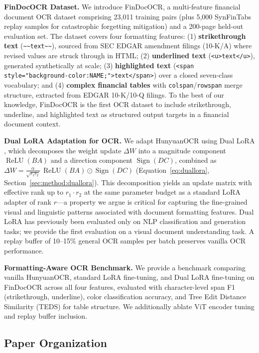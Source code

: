 \documentclass[10pt,twocolumn]{article}
\begin{document}
\textbf{FinDocOCR Dataset.} We introduce FinDocOCR, a multi-feature financial
document OCR dataset comprising 23{,}011 training pairs (plus 5{,}000 SynFinTabs
replay samples for catastrophic forgetting mitigation) and a 200-page held-out
evaluation set. The dataset covers four formatting features: (1)
\textbf{strikethrough text}
(\texttt{\textasciitilde\textasciitilde{}text\textasciitilde\textasciitilde}),
sourced from SEC EDGAR amendment filings (10-K/A) where revised values are
struck through in HTML; (2) \textbf{underlined text} (\texttt{<u>text</u>}),
generated synthetically at scale; (3) \textbf{highlighted text}
(\texttt{<span style="background-color:NAME;">text</span>}) over a closed seven-class
vocabulary; and (4) \textbf{complex financial tables} with
\texttt{colspan}/\texttt{rowspan} merge structure, extracted from EDGAR 10-K/10-Q
filings. To the best of our knowledge, FinDocOCR is the first OCR dataset to
include strikethrough, underline, and highlighted text as structured output targets
in a financial document context.

\textbf{Dual LoRA Adaptation for OCR.} We adapt HunyuanOCR using Dual LoRA
\cite{xu2025duallora}, which decomposes the weight update $\Delta W$ into a
magnitude component $\operatorname{ReLU}(BA)$ and a direction component
$\operatorname{Sign}(DC)$, combined as
$\Delta W = \frac{\alpha}{\sqrt{r_1 r_2}}\,\operatorname{ReLU}(BA) \odot \operatorname{Sign}(DC)$
(Equation~\eqref{eq:duallora}, Section~\ref{sec:method:duallora}).
This decomposition yields an update matrix with effective rank up to $r_1 \cdot
r_2$ at the same parameter budget as a standard LoRA adapter of rank
$r$---a property we argue is critical for capturing the fine-grained visual and
linguistic patterns associated with document formatting features. Dual LoRA has
previously been evaluated only on NLP classification and generation tasks; we
provide the first evaluation on a visual document understanding task. A replay
buffer of 10--15\% general OCR samples per batch preserves vanilla OCR
performance.

\textbf{Formatting-Aware OCR Benchmark.} We provide a benchmark comparing
vanilla HunyuanOCR, standard LoRA fine-tuning, and Dual LoRA fine-tuning on
FinDocOCR across all four features, evaluated with character-level span F1
(strikethrough, underline), color classification accuracy, and Tree Edit
Distance Similarity (TEDS) \cite{zhong2020teds} for table structure. We
additionally ablate ViT encoder tuning and replay buffer inclusion.

\subsection{Paper Organization}
\label{sec:intro:organization}
\end{document}
